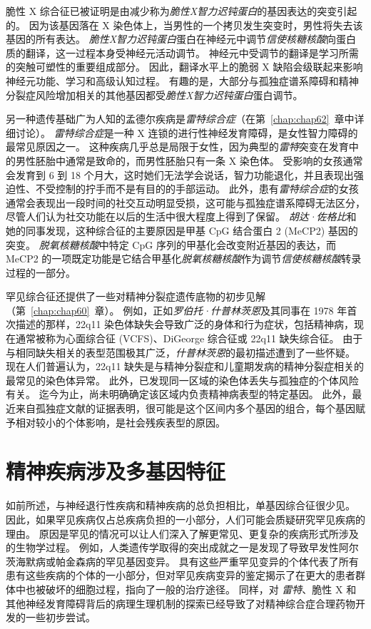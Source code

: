 脆性 X 综合征已被证明是由减少称为\textit{脆性X智力迟钝蛋白}的基因表达的突变引起的。
因为该基因落在 X 染色体上，当男性的一个拷贝发生突变时，男性将失去该基因的所有表达。
\textit{脆性X智力迟钝蛋白}蛋白在神经元中调节\textit{信使核糖核酸}向蛋白质的翻译，这一过程本身受神经元活动调节。
神经元中受调节的翻译是学习所需的突触可塑性的重要组成部分。
因此，翻译水平上的脆弱 X 缺陷会级联起来影响神经元功能、学习和高级认知过程。
有趣的是，大部分与孤独症谱系障碍和精神分裂症风险增加相关的其他基因都受\textit{脆性X智力迟钝蛋白}蛋白调节。


另一种遗传基础广为人知的孟德尔疾病是\textit{雷特综合症}（在第~\ref{chap:chap62}~章中详细讨论）。
\textit{雷特综合症}是一种 X 连锁的进行性神经发育障碍，是女性智力障碍的最常见原因之一。
这种疾病几乎总是局限于女性，因为典型的\textit{雷特}突变在发育中的男性胚胎中通常是致命的，而男性胚胎只有一条 X 染色体。
受影响的女孩通常会发育到 6 到 18 个月大，这时她们无法学会说话，智力功能退化，并且表现出强迫性、不受控制的拧手而不是有目的的手部运动。
此外，患有\textit{雷特综合症}的女孩通常会表现出一段时间的社交互动明显受损，这可能与孤独症谱系障碍无法区分，尽管人们认为社交功能在以后的生活中很大程度上得到了保留。
\textit{胡达·佐格比}和她的同事发现，这种综合征的主要原因是甲基 CpG 结合蛋白 2 (MeCP2) 基因的突变。
\textit{脱氧核糖核酸}中特定 CpG 序列的甲基化会改变附近基因的表达，而 MeCP2 的一项既定功能是它结合甲基化\textit{脱氧核糖核酸}作为调节\textit{信使核糖核酸}转录过程的一部分。


罕见综合征还提供了一些对精神分裂症遗传底物的初步见解（第~\ref{chap:chap60}~章）。
例如，正如\textit{罗伯托·什普林茨恩}及其同事在 1978 年首次描述的那样，22q11 染色体缺失会导致广泛的身体和行为症状，包括精神病，现在通常被称为心面综合征 (VCFS)、DiGeorge 综合征或 22q11 缺失综合征。
由于与相同缺失相关的表型范围极其广泛，\textit{什普林茨恩}的最初描述遭到了一些怀疑。
现在人们普遍认为，22q11 缺失是与精神分裂症和儿童期发病的精神分裂症相关的最常见的染色体异常。
此外，已发现同一区域的染色体丢失与孤独症的个体风险有关。
迄今为止，尚未明确确定该区域内负责精神病表型的特定基因。
此外，最近来自孤独症文献的证据表明，很可能是这个区间内多个基因的组合，每个基因赋予相对较小的个体影响，是社会残疾表型的原因。



\section{精神疾病涉及多基因特征}

如前所述，与神经退行性疾病和精神疾病的总负担相比，单基因综合征很少见。
因此，如果罕见疾病仅占总疾病负担的一小部分，人们可能会质疑研究罕见疾病的理由。
原因是罕见的情况可以让人们深入了解更常见、更复杂的疾病形式所涉及的生物学过程。
例如，人类遗传学取得的突出成就之一是发现了导致早发性阿尔茨海默病或帕金森病的罕见基因变异。
具有这些严重罕见变异的个体代表了所有患有这些疾病的个体的一小部分，但对罕见疾病变异的鉴定揭示了在更大的患者群体中也被破坏的细胞过程，指向了一般的治疗途径。
同样，对 \textit{雷特}、脆性 X 和其他神经发育障碍背后的病理生理机制的探索已经导致了对精神综合症合理药物开发的一些初步尝试。


